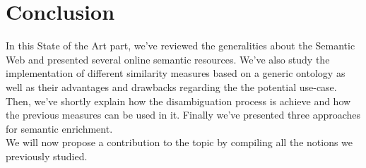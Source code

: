 
\chapter{Conclusion} %

\label{chapter:SotAConclusion} %


In this State of the Art part, we've reviewed the generalities about the Semantic Web and presented several online semantic resources. We've also study the implementation of different similarity measures based on a generic ontology as well as their advantages and drawbacks regarding the the potential use-case. Then, we've shortly explain how the disambiguation process is achieve and how the previous measures can be used in it. Finally we've presented three approaches for semantic enrichment.\\

We will now propose a contribution to the topic by compiling all the notions we previously studied.